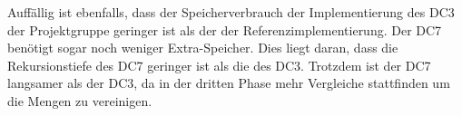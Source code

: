 Auffällig ist ebenfalls, dass der Speicherverbrauch der Implementierung des DC3 der Projektgruppe geringer ist als der der Referenzimplementierung. Der DC7 benötigt sogar noch weniger Extra-Speicher. Dies liegt daran, dass die Rekursionstiefe des DC7 geringer ist als die des DC3. Trotzdem ist der DC7 langsamer als der DC3, da in der dritten Phase mehr Vergleiche stattfinden um die Mengen zu vereinigen.